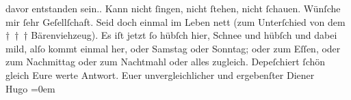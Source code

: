 \begin{ledgroupsized}[t]{13cm}
{{{                  davor entstanden sein.}}}\label{K_L01655_1h}. Kann nicht ſingen, nicht ſtehen, nicht ſchauen.
               Wünſche mir ſehr Geſellſchaft. Seid doch einmal im Leben nett (zum Unterſchied von
               dem † † † Bärenviehzeug). Es iſt jetzt ſo hübſch hier, Schnee und hübſch und dabei
               mild, alſo {\pb}kommt einmal her, oder Samstag oder Sonntag; oder zum Eſſen,
               oder zum Nachmittag oder zum Nachtmahl oder alles zugleich.\pend
           \pstart
           Depeſchiert ſchön gleich Eure werte Antwort.\pend
           \pstart
           Euer unvergleichlicher und ergebenſter Diener{\\[\baselineskip]}\spacefill\mbox{Hugo}\pend
           \leftskip=0em{}
         
         \endnumbering{}\end{ledgroupsized}  \newcommand{\dateiname}{L01655}\newcommand{\titel}{Hugo von Hofmannsthal an Arthur Schnitzler, [zwischen 3.–7. 2. 1907]}\newcommand{\editorInnen}{Martin Anton Müller und Gerd-Hermann Susen}
      